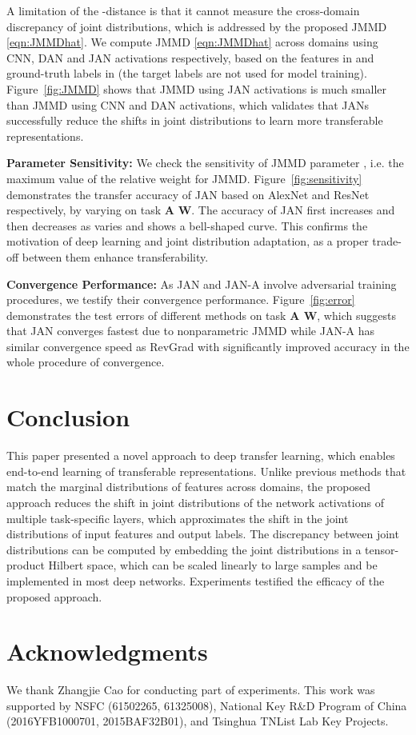 \documentclass{article}
\begin{document}
A limitation of the -distance is that it cannot measure the cross-domain discrepancy of joint distributions, which is addressed by the proposed JMMD \eqref{eqn:JMMDhat}. We compute JMMD \eqref{eqn:JMMDhat} across domains using CNN, DAN and JAN activations respectively, based on the features in  and ground-truth labels in  (the target labels are not used for model training). Figure~\ref{fig:JMMD} shows that JMMD using JAN activations is much smaller than JMMD using CNN and DAN activations, which validates that JANs successfully reduce the shifts in joint distributions to learn more transferable representations.

\textbf{Parameter Sensitivity:}
We check the sensitivity of JMMD parameter , i.e. the maximum value of the relative weight for JMMD. Figure~\ref{fig:sensitivity} demonstrates the transfer accuracy of JAN based on AlexNet and ResNet respectively, by varying  on task \textbf{A}  \textbf{W}. The accuracy of JAN first increases and then decreases as  varies and shows a bell-shaped curve. This confirms the motivation of deep learning and joint distribution adaptation, as a proper trade-off between them enhance transferability.

\textbf{Convergence Performance:}
As JAN and JAN-A involve adversarial training procedures, we testify their convergence performance. Figure~\ref{fig:error} demonstrates the test errors of different methods on task \textbf{A  W}, which suggests that JAN converges fastest due to nonparametric JMMD while JAN-A has similar convergence speed as RevGrad with significantly improved accuracy in the whole procedure of convergence.

\section{Conclusion}
This paper presented a novel approach to deep transfer learning, which enables end-to-end learning of transferable representations. Unlike previous methods that match the marginal distributions of features across domains, the proposed approach reduces the shift in joint distributions of the network activations of multiple task-specific layers, which approximates the shift in the joint distributions of input features and output labels. The discrepancy between  joint distributions can be computed by embedding the joint distributions in a tensor-product Hilbert space, which can be scaled linearly to large samples and be implemented in most deep networks. Experiments testified the efficacy of the proposed approach.

\section*{Acknowledgments}
We thank Zhangjie Cao for conducting part of experiments. This work was supported by NSFC (61502265, 61325008), National Key R\&D Program of China (2016YFB1000701, 2015BAF32B01), and Tsinghua TNList Lab Key Projects.



\end{document}

